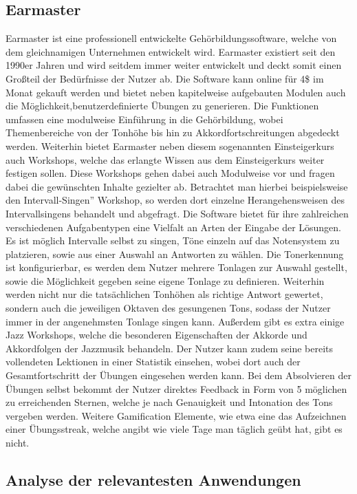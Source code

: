 \subsection*{Earmaster}
\label{sec:Earmaster}
Earmaster ist eine professionell entwickelte Gehörbildungssoftware, welche von dem gleichnamigen Unternehmen entwickelt wird. Earmaster existiert seit den 1990er Jahren und wird seitdem immer weiter entwickelt und deckt somit einen Großteil der Bedürfnisse der Nutzer ab. Die Software kann online für
4\$ im Monat gekauft werden und bietet neben kapitelweise aufgebauten Modulen auch die Möglichkeit,benutzerdefinierte Übungen zu generieren. Die Funktionen umfassen eine modulweise Einführung in die Gehörbildung, wobei Themenbereiche von der Tonhöhe bis hin zu Akkordfortschreitungen abgedeckt werden. Weiterhin bietet Earmaster neben diesem sogenannten Einsteigerkurs auch Workshops, welche das erlangte Wissen aus dem Einsteigerkurs weiter festigen sollen. Diese Workshops gehen dabei auch Modulweise vor und fragen dabei die gewünschten Inhalte gezielter ab. Betrachtet man hierbei beispielsweise den \glqq Intervall-Singen'' Workshop, so werden dort einzelne Herangehensweisen des Intervallsingens behandelt und abgefragt. Die Software bietet für ihre zahlreichen verschiedenen Aufgabentypen eine Vielfalt an Arten der Eingabe der Lösungen. Es ist möglich Intervalle selbst zu singen, Töne einzeln auf das Notensystem zu platzieren, sowie aus einer Auswahl an Antworten zu wählen. Die Tonerkennung ist konfigurierbar, es werden dem Nutzer mehrere Tonlagen zur Auswahl gestellt, sowie die Möglichkeit gegeben seine eigene Tonlage zu definieren. Weiterhin werden nicht nur die tatsächlichen Tonhöhen als richtige Antwort gewertet, sondern auch die jeweiligen Oktaven des gesungenen Tons, sodass der Nutzer immer in der angenehmsten Tonlage singen kann. Außerdem gibt es extra einige Jazz Workshops, welche die besonderen Eigenschaften der Akkorde und Akkordfolgen der Jazzmusik behandeln. Der Nutzer kann zudem seine bereits vollendeten Lektionen
in einer Statistik einsehen, wobei dort auch der Gesamtfortschritt der Übungen eingesehen werden kann. Bei dem Absolvieren der Übungen selbst bekommt der Nutzer direktes Feedback in Form von 5 möglichen zu erreichenden Sternen, welche je nach Genauigkeit und Intonation des Tons vergeben werden. Weitere Gamification Elemente, wie etwa eine das Aufzeichnen einer Übungsstreak, welche angibt wie viele Tage man täglich geübt hat, gibt es nicht. \cite{earmaster}

\subsection{Analyse der relevantesten Anwendungen}


